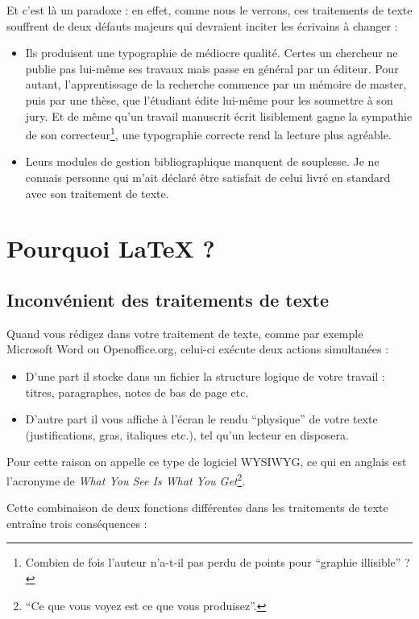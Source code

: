 Et c'est là un paradoxe : en effet, comme nous le verrons, ces traitements de texte souffrent de deux défauts majeurs qui devraient inciter les écrivains à changer :
\begin{itemize}
\item Ils produisent une typographie de médiocre qualité. Certes un chercheur ne publie pas lui-même ses travaux mais passe en général par un éditeur. Pour autant, l'apprentissage de la recherche commence par un mémoire de master, puis par une thèse, que l'étudiant édite lui-même pour les soumettre à son jury. Et de même qu'un travail manuscrit écrit lisiblement gagne la sympathie de son correcteur\footnote{Combien de fois l'auteur n'a-t-il pas perdu de points pour \enquote{graphie illisible} ?},  une typographie correcte rend la lecture plus agréable.
\item Leurs modules de gestion bibliographique manquent de souplesse. Je ne connais personne qui m'ait déclaré être satisfait de celui livré en standard avec son traitement de texte.
\end{itemize}

\section{Pourquoi \LaTeX{} ?}

\subsection{Inconvénient des traitements de texte}

Quand vous rédigez dans votre traitement de texte, comme par exemple Microsoft Word ou \hbox{Openoffice.org,} celui-ci exécute deux actions simultanées :

\begin{itemize}
\item D'une part il stocke dans un fichier la structure logique de votre travail : titres, paragraphes, notes de bas de page etc.
\item D'autre part il vous affiche à l'écran le rendu \enquote{physique} de votre texte (justifications, gras, italiques etc.), tel qu'un lecteur en disposera.
\end{itemize}

Pour cette raison on appelle ce type de logiciel WYSIWYG, ce qui en anglais est l'acronyme de  \textenglish{\emph{What You See Is What You Get}}\footnote{\enquote{Ce que vous voyez est ce que vous produisez}.}. 

Cette combinaison de deux fonctions différentes dans les  traitements de texte entraîne trois conséquences :


